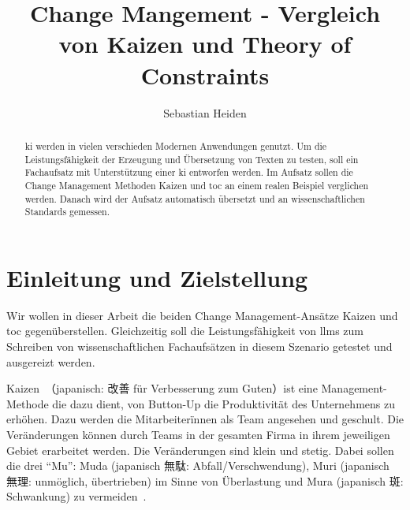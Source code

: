 \documentclass[acmengage,authorversion,nonacm]{acmart}
\begin{document}
	
%

	\title{Change Mangement - Vergleich von Kaizen und Theory of Constraints}
	
	\author{Sebastian Heiden}

\begin{abstract}
\gls{ki} werden in vielen verschieden Modernen Anwendungen genutzt. Um die Leistungsfähigkeit der Erzeugung und Übersetzung von Texten zu testen, soll ein Fachaufsatz mit Unterstützung einer \gls{ki} entworfen werden. Im Aufsatz sollen die Change Management Methoden Kaizen und \gls{toc} an einem realen Beispiel verglichen werden. Danach wird der Aufsatz automatisch übersetzt und an wissenschaftlichen Standards gemessen.
\end{abstract}


\received{\today}


\maketitle

\section{Einleitung und Zielstellung}

Wir wollen in dieser Arbeit die beiden Change Management-Ansätze Kaizen und \gls{toc} gegenüberstellen.
Gleichzeitig soll die Leistungsfähigkeit von \glspl{llm} zum Schreiben von wissenschaftlichen Fachaufsätzen in diesem Szenario getestet und ausgereizt werden.

Kaizen~（japanisch: 改善 für Verbesserung zum Guten）ist eine Management-Methode die dazu dient, von Button-Up die Produktivität des Unternehmens zu erhöhen.
Dazu werden die Mitarbeiterïnnen als Team angesehen und geschult. Die Veränderungen können durch Teams in der gesamten Firma in ihrem jeweiligen Gebiet erarbeitet werden.
Die Veränderungen sind klein und stetig. Dabei sollen die drei "`Mu"': Muda (japanisch 無駄: Abfall/Verschwendung), Muri (japanisch 無理: unmöglich, übertrieben) im Sinne von Überlastung und Mura (japanisch 斑: Schwankung) zu vermeiden~\cite{helmold_kaizen_2021}.
\end{document}
